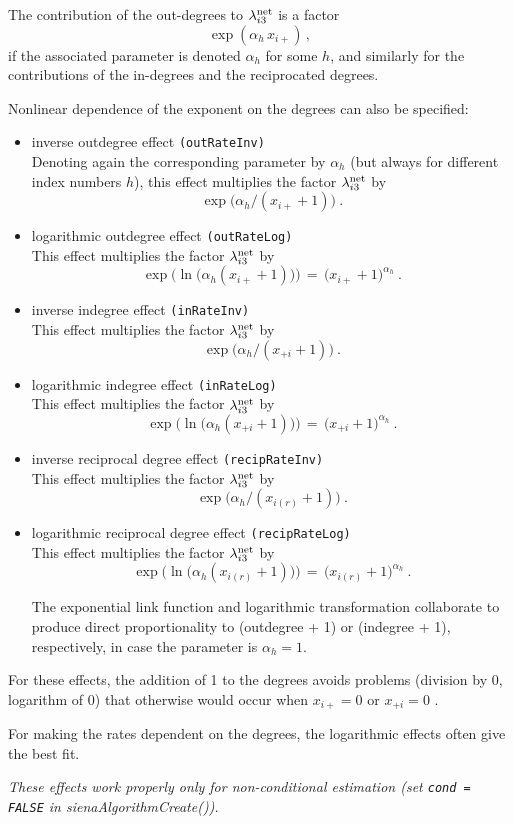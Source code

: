 \documentclass[a4paper,fleqn,11pt]{article}
\newcommand{\+}{\, + \,}
\newcommand{\sfn}[1]{\textsf{#1}}
\begin{document}
\begin{enumerate}
The contribution of the out-degrees to $\lambda^{\rm net}_{i3}$
is a factor
 \[ \exp( \alpha_h \, x_{i+})\,, \]
if the associated parameter is denoted $\alpha_h$ for some $h$,
and similarly for the contributions of the in-degrees and the
reciprocated degrees.

 Nonlinear dependence of the exponent on the degrees
 can also be specified:
 \begin{itemize}
 \item inverse outdegree effect  \texttt{(outRateInv)} \\
 Denoting again the corresponding parameter by $\alpha_h$
 (but always for different index numbers $h$),
 this effect multiplies the factor $\lambda^{\rm net}_{i3}$ by
 \[ \exp\big( \alpha_h / (x_{i+} +1)\big) \ . \]
 \item logarithmic outdegree effect  \texttt{(outRateLog)} \\
 This effect multiplies the factor $\lambda^{\rm net}_{i3}$ by
 \[ \exp\Big( \ln\big(\alpha_h (x_{i+} +1)\big)\Big) \,=\,
                 \big(x_{i+} +1\big)^{\alpha_h} \ . \]

 \item inverse indegree effect  \texttt{(inRateInv)} \\
 This effect multiplies the factor $\lambda^{\rm net}_{i3}$ by
 \[ \exp\big( \alpha_h / (x_{+i} +1)\big) \ . \]
 \item logarithmic indegree effect  \texttt{(inRateLog)} \\
 This effect multiplies the factor $\lambda^{\rm net}_{i3}$ by
 \[ \exp\Big( \ln\big(\alpha_h (x_{+i} +1)\big)\Big) \,=\,
                 \big(x_{+i} +1\big)^{\alpha_h} \ . \]


 \item inverse reciprocal degree effect  \texttt{(recipRateInv)} \\
 This effect multiplies the factor $\lambda^{\rm net}_{i3}$ by
 \[ \exp\big( \alpha_h / (x_{i(r)} +1)\big) \ . \]
 \item logarithmic reciprocal degree effect  \texttt{(recipRateLog)} \\
 This effect multiplies the factor $\lambda^{\rm net}_{i3}$ by
 \[ \exp\Big( \ln\big(\alpha_h (x_{i(r)} +1)\big)\Big) \,=\,
                 \big(x_{i(r)} +1\big)^{\alpha_h} \ . \]

 The exponential link function and logarithmic transformation collaborate
 to produce direct proportionality to (outdegree + 1) or (indegree + 1),
 respectively, in case the parameter is $\alpha_h=1$.
 \end{itemize}
 For these effects, the addition of 1 to the degrees avoids
 problems (division by 0, logarithm of 0) that otherwise would occur
 when $ x_{i+} = 0$ or $ x_{+i} = 0$ .

 For making the rates dependent on the degrees,
 the  logarithmic effects often give the best fit.

 \emph{These effects work properly only for non-conditional estimation
    (set \texttt{cond = FALSE} in \sfn{sienaAlgorithmCreate()}).  }
\end{enumerate}
\end{document}
